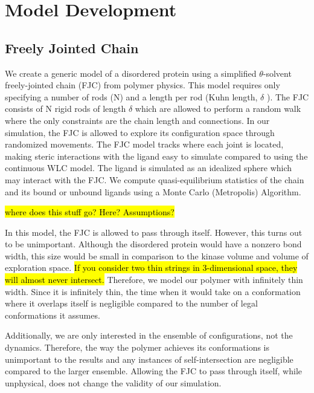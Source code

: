 \documentclass[../AdvancementSummary.tex]{subfiles}
\begin{document}
\section{Model Development}
\label{sec:ModelDev}

\subsection{Freely Jointed Chain}

We create a generic model of a disordered protein using a simplified $\theta$-solvent freely-jointed chain (FJC) from polymer physics. This model requires only specifying a number of rods (N) and a length per rod (Kuhn length, $\delta$ ).  The FJC consists of N rigid rods of length $\delta$ which are allowed to perform a random walk where the only constraints are the chain length and connections. In our simulation, the FJC is allowed to explore its configuration space through randomized movements.  The FJC model tracks where each joint is located, making steric interactions with the ligand easy to simulate compared to using the continuous WLC model.  The ligand is simulated as an idealized sphere which may interact with the FJC. We compute quasi-equilibrium statistics of the chain and its bound or unbound ligands using a Monte Carlo (Metropolis) Algorithm. 


\hl{where does this stuff go?  Here?  Assumptions?}

In this model, the FJC is allowed to pass through itself. However, this turns out to be unimportant. Although the disordered protein would have a nonzero bond width, this size would be small in comparison to the kinase volume and volume of exploration space.  \hl{If you consider two thin strings in 3-dimensional space, they will almost never intersect.}  Therefore, we model our polymer with infinitely thin width.  Since it is infinitely thin, the time when it would take on a conformation where it overlaps itself is negligible compared to the number of legal conformations it assumes.

Additionally, we are only interested in the ensemble of configurations, not the dynamics. Therefore, the way the polymer achieves its conformations is unimportant to the results and any instances of self-intersection are negligible compared to the larger ensemble. Allowing the FJC to pass through itself, while unphysical, does not change the validity of our simulation.
\end{document}

